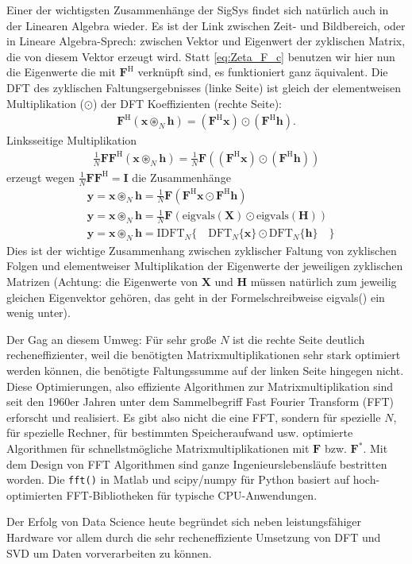 Einer der wichtigsten Zusammenhänge der SigSys findet sich natürlich auch
in der Linearen Algebra wieder. Es ist der Link zwischen Zeit- und Bildbereich, oder
in Lineare Algebra-Sprech: zwischen Vektor und Eigenwert der zyklischen Matrix, die von diesem
Vektor erzeugt wird. Statt \eqref{eq:Zeta_F_c} benutzen wir hier nun die Eigenwerte
die mit $\bm{F}^\mathrm{H}$ verknüpft sind, es funktioniert ganz äquivalent.
%
Die DFT des zyklischen Faltungsergebnisses (linke Seite)
ist gleich der elementweisen Multiplikation ($\odot$) der DFT Koeffizienten (rechte Seite):
\begin{align}
\bm{F}^\mathrm{H}(\bm{x} \circledast_N \bm{h}) = (\bm{F}^\mathrm{H}\bm{x})  \odot (\bm{F}^\mathrm{H}\bm{h}).
\end{align}
Linksseitige Multiplikation
\begin{align}
\frac{1}{N} \bm{F}\bm{F}^\mathrm{H}(\bm{x} \circledast_N \bm{h}) =
\frac{1}{N} \bm{F}\left( (\bm{F}^\mathrm{H}\bm{x})  \odot (\bm{F}^\mathrm{H}\bm{h}) \right)
\end{align}
erzeugt wegen $\frac{1}{N} \bm{F}\bm{F}^\mathrm{H} = \bm{I}$ die Zusammenhänge
\begin{align}
&\bm{y} = \bm{x} \circledast_N \bm{h} =
\frac{1}{N} \bm{F} \left( \bm{F}^\mathrm{H}\bm{x}  \odot \bm{F}^\mathrm{H}\bm{h} \right)\\
&\bm{y} = \bm{x} \circledast_N \bm{h} =
\frac{1}{N} \bm{F}\left( \mathrm{eigvals}(\bm{X})  \odot \mathrm{eigvals}(\bm{H}) \right)\\
&\bm{y} = \bm{x} \circledast_N \bm{h} = \mathrm{IDFT}_N\{\quad  \mathrm{DFT}_N\{\bm{x}\} \odot  \mathrm{DFT}_N\{\bm{h}\} \quad \}
\end{align}
Dies ist der wichtige Zusammenhang zwischen zyklischer Faltung von zyklischen Folgen und
elementweiser Multiplikation der Eigenwerte der jeweiligen zyklischen Matrizen
(Achtung: die Eigenwerte von $\bm{X}$ und $\bm{H}$ müssen natürlich zum jeweilig gleichen
Eigenvektor gehören, das geht in der Formelschreibweise eigvals() ein wenig unter).
%

Der Gag an diesem Umweg:
Für sehr große $N$ ist die rechte Seite deutlich recheneffizienter, weil
die benötigten Matrixmultiplikationen sehr stark optimiert werden können, die benötigte
Faltungssumme auf der linken Seite hingegen nicht.
%
Diese Optimierungen, also effiziente Algorithmen zur Matrixmultiplikation
sind seit den 1960er Jahren unter dem Sammelbegriff Fast Fourier Transform
(FFT) erforscht und realisiert.
Es gibt also nicht die eine FFT, sondern für spezielle $N$, für
spezielle Rechner, für bestimmten Speicheraufwand usw.
optimierte Algorithmen für schnellstmögliche Matrixmultiplikationen mit
$\bm{F}$ bzw. $\bm{F}^\mathrm{*}$. Mit dem Design von FFT Algorithmen sind ganze
Ingenieurslebensläufe bestritten worden. Die \texttt{fft()} in Matlab und
scipy/numpy für Python basiert auf hoch-optimierten FFT-Bibliotheken für
typische CPU-Anwendungen.

Der Erfolg von Data Science heute begründet sich neben leistungsfähiger Hardware
vor allem durch die sehr recheneffiziente Umsetzung von DFT und SVD um Daten
vorverarbeiten zu können.
